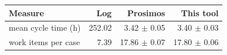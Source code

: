 \begin{tabular}{lrrr}
\toprule
Measure & Log & Prosimos & This tool \\
\midrule
mean cycle time (h) & 252.02 & 3.42 $\pm$ 0.05 & 3.40 $\pm$ 0.03 \\
work items per case & 7.39 & 17.86 $\pm$ 0.07 & 17.80 $\pm$ 0.06 \\
\bottomrule
\end{tabular}
